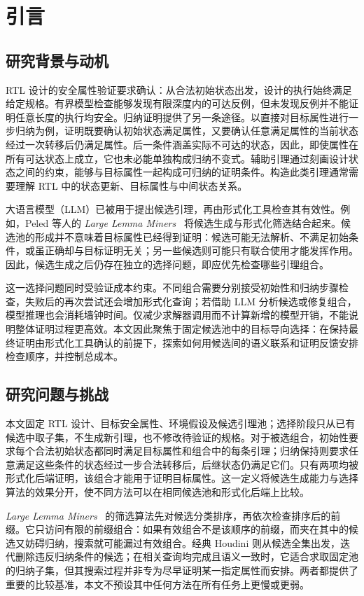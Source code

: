 \section{引言}

\subsection{研究背景与动机}

RTL 设计的安全属性验证要求确认：从合法初始状态出发，设计的执行始终满足给定规格。有界模型检查能够发现有限深度内的可达反例，但未发现反例并不能证明任意长度的执行均安全。归纳证明提供了另一条途径。以直接对目标属性进行一步归纳为例，证明既要确认初始状态满足属性，又要确认任意满足属性的当前状态经过一次转移后仍满足属性。后一条件涵盖实际不可达的状态，因此，即使属性在所有可达状态上成立，它也未必能单独构成归纳不变式。辅助引理通过刻画设计状态之间的约束，能够与目标属性一起构成可归纳的证明条件。构造此类引理通常需要理解 RTL 中的状态更新、目标属性与中间状态关系。

大语言模型（LLM）已被用于提出候选引理，再由形式化工具检查其有效性。例如，Peled 等人的 \emph{Large Lemma Miners}~\cite{peled2026large} 将候选生成与形式化筛选结合起来。候选池的形成并不意味着目标属性已经得到证明：候选可能无法解析、不满足初始条件，或虽正确却与目标证明无关；另一些候选则可能只有联合使用才能发挥作用。因此，候选生成之后仍存在独立的选择问题，即应优先检查哪些引理组合。

这一选择问题同时受验证成本约束。不同组合需要分别接受初始性和归纳步骤检查，失败后的再次尝试还会增加形式化查询；若借助 LLM 分析候选或修复组合，模型推理也会消耗墙钟时间。仅减少求解器调用而不计算新增的模型开销，不能说明整体证明过程更高效。本文因此聚焦于固定候选池中的目标导向选择：在保持最终证明由形式化工具确认的前提下，探索如何用候选间的语义联系和证明反馈安排检查顺序，并控制总成本。

\subsection{研究问题与挑战}

本文固定 RTL 设计、目标安全属性、环境假设及候选引理池；选择阶段只从已有候选中取子集，不生成新引理，也不修改待验证的规格。对于被选组合，初始性要求每个合法初始状态都同时满足目标属性和组合中的每条引理；归纳保持则要求任意满足这些条件的状态经过一步合法转移后，后继状态仍满足它们。只有两项均被形式化后端证明，该组合才能用于证明目标属性。这一定义将候选生成能力与选择算法的效果分开，使不同方法可以在相同候选池和形式化后端上比较。

\emph{Large Lemma Miners}~\cite{peled2026large} 的筛选算法先对候选分类排序，再依次检查排序后的前缀。它只访问有限的前缀组合：如果有效组合不是该顺序的前缀，而夹在其中的候选又妨碍归纳，搜索就可能漏过有效组合。经典 Houdini 则从候选全集出发，迭代删除违反归纳条件的候选；在相关查询均完成且语义一致时，它适合求取固定池的归纳子集，但其搜索过程并非专为尽早证明某一指定属性而安排。两者都提供了重要的比较基准，本文不预设其中任何方法在所有任务上更慢或更弱。

